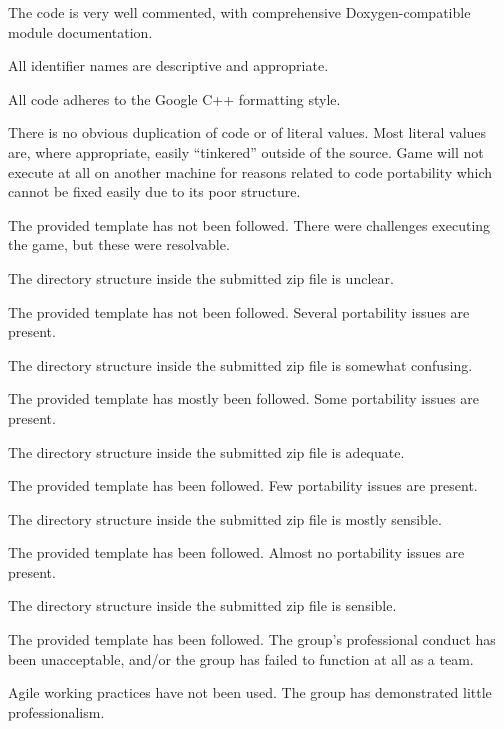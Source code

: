 \documentclass{../fal_assignment}
\begin{document}
\begin{markingrubric}
        \grade The code is very well commented, with comprehensive Doxygen-compatible module documentation.
            \par All identifier names are descriptive and appropriate.
            \par All code adheres to the Google C++ formatting style.
             \par There is no obvious duplication of code or of literal values. Most literal values are, where appropriate, easily ``tinkered'' outside of the source.  
%
        \grade\fail Game will not execute at all on another machine for reasons related to code portability which cannot be fixed easily due to its poor structure.
            \par The provided template has not been followed.
        \grade There were challenges executing the game, but these were resolvable.
            \par The directory structure inside the submitted zip file is unclear.
            \par The provided template has not been followed.
        \grade Several portability issues are present.
            \par The directory structure inside the submitted zip file is somewhat confusing.
            \par The provided template has mostly been followed.
        \grade Some portability issues are present.
            \par The directory structure inside the submitted zip file is adequate.
            \par The provided template has been followed.
        \grade Few portability issues are present.
            \par The directory structure inside the submitted zip file is mostly sensible.
            \par The provided template has been followed.
        \grade Almost no portability issues are present.
            \par The directory structure inside the submitted zip file is sensible.
            \par The provided template has been followed.
%
        \grade\fail The group's professional conduct has been unacceptable,
            and/or the group has failed to function at all as a team.
            \par Agile working practices have not been used.
        \grade The group has demonstrated little professionalism.

\end{markingrubric}
\end{document}
